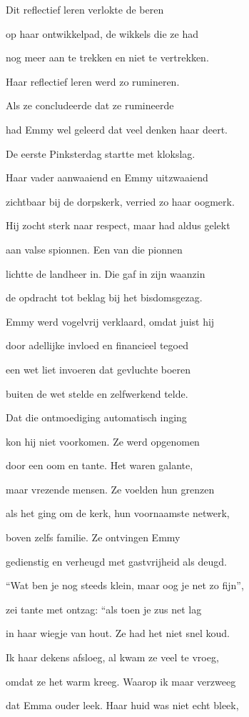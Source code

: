 Dit reflectief leren
verlokte de beren

op haar ontwikkelpad,
de wikkels die ze had

nog meer aan te trekken
en niet te vertrekken.

Haar reflectief leren
werd zo rumineren.

Als ze concludeerde
dat ze rumineerde

had Emmy wel geleerd
dat veel denken haar deert.

De eerste Pinksterdag
startte met klokslag.

Haar vader aanwaaiend
en Emmy uitzwaaiend

zichtbaar bij de dorpskerk,
verried zo haar oogmerk.

Hij zocht sterk naar respect,
maar had aldus gelekt

aan valse spionnen.
Een van die pionnen

lichtte de landheer in.
Die gaf in zijn waanzin

de opdracht tot beklag
bij het bisdomsgezag.

Emmy werd vogelvrij
verklaard, omdat juist hij

door adellijke invloed
en financieel tegoed

een wet liet invoeren
dat gevluchte boeren

buiten de wet stelde
en zelfwerkend telde.

Dat die ontmoediging
automatisch inging

kon hij niet voorkomen.
Ze werd opgenomen

door een oom en tante.
Het waren galante,

maar vrezende mensen.
Ze voelden hun grenzen

als het ging om de kerk,
hun voornaamste netwerk,

boven zelfs familie.
Ze ontvingen Emmy

gedienstig en verheugd
met gastvrijheid als deugd.

“Wat ben je nog steeds klein,
maar oog je net zo fijn”,

zei tante met ontzag:
“als toen je zus net lag

in haar wiegje van hout.
Ze had het niet snel koud.

Ik haar dekens afsloeg,
al kwam ze veel te vroeg,

omdat ze het warm kreeg.
Waarop ik maar verzweeg

dat Emma ouder leek.
Haar huid was niet echt bleek,

